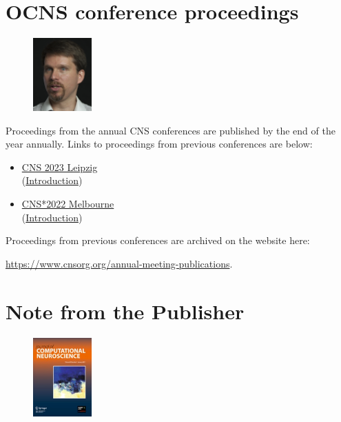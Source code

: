 \documentclass[11pt,a4paper,oneside]{article}
\begin{document}
\clearpage
\section*{OCNS conference proceedings}%
\begin{figure}
  \includegraphics[width=0.2\textwidth]{images/bojak}
\end{figure}

Proceedings from the annual CNS conferences are published by the end of the year annually.
Links to proceedings from previous conferences are below:
\begin{multicols}{2}
    \begin{itemize}
      \item \href{https://link.springer.com/article/10.1007/s10827-024-00871-5}{CNS 2023 Leipzig}\\(\href{https://link.springer.com/article/10.1007/s10827-024-00872-4}{Introduction})
      \item \href{https://link.springer.com/article/10.1007/s10827-022-00841-9}{CNS*2022 Melbourne}\\(\href{https://link.springer.com/article/10.1007/s10827-022-00843-7}{Introduction})
    \end{itemize}
\end{multicols}

Proceedings from previous conferences are archived on the website here:

\begin{center}
\url{https://www.cnsorg.org/annual-meeting-publications}.
\end{center}
\vspace{2ex}

\section*{Note from the Publisher}%
\begin{figure}
  \includegraphics[width=0.2\textwidth]{images/jcns2011}
\end{figure}
\end{document}
